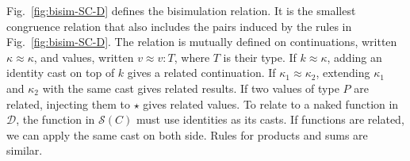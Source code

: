 \documentclass[acmsmall,review,anonymous]{acmart}\settopmatter{printfolios=true,printccs=false,printacmref=false}
\newcommand{\TOOdyn}[0]{\star}
\newcommand{\ineffCEKD}{$\mathcal{D}$}
\newcommand{\effCEK}[1]{$\mathcal{S}(#1)$}
\begin{document}
Fig.~\ref{fig:bisim-SC-D} defines the bisimulation relation.  It is
the smallest congruence relation that also includes the pairs induced
by the rules in Fig.~\ref{fig:bisim-SC-D}.
%
The relation is mutually defined on continuations, written $\kappa
\approx \kappa$, and values, written $v \approx v : T$, where $T$ is
their type.
%
If $k \approx \kappa$, adding an identity cast on top of $k$ gives a related 
continuation.
%
%
If $\kappa_1 \approx \kappa_2$, extending $\kappa_1$ and $\kappa_2$ with the 
same cast gives related results.
%
If two values of type $P$ are related, injecting them to $\TOOdyn$ gives 
related values.
%
%
To relate to a naked function in \ineffCEKD, the function in \effCEK{C} 
must use identities as its casts.
%
If functions are related, we can apply the same cast on both side.
%
Rules for products and sums are similar.
\end{document}
